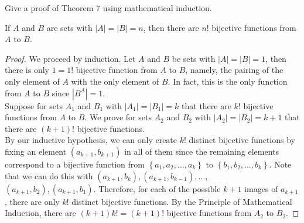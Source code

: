 \documentclass[12pt]{article}
\newcommand{\Abs}[1]{\left\vert #1 \right\vert}
\newenvironment{problem}[2][Problem]{\begin{trivlist} \item[\hskip \labelsep {\bfseries #1}\hskip \labelsep {\bfseries #2.}]}{\end{trivlist}}
\newenvironment{solution}[1][Solution]{\begin{trivlist} \item[\hskip \labelsep {\bfseries #1}]}{\end{trivlist}}
\begin{document}
    \begin{problem}{34}
      Give a proof of Theorem 7 using mathematical induction.
    \begin{solution}
      If $A$ and $B$ are sets with $|A|=|B|=n$, then there are $n!$ bijective functions from $A$ to $B$. 
    \begin{proof}
      We proceed by induction. Let $A$ and $B$ be sets with $|A|=|B|=1$, then there is only $1=1!$ bijective function from $A$ to $B$, namely, the pairing of the only element of $A$ with the only element of $B$. In fact, this is the only function from $A$ to $B$ since $\Abs{B^{A}} = 1$. \\
      Suppose for sets $A_{1}$ and $B_{1}$ with $|A_{1}| = |B_{1}|=k$ that there are $k!$ bijective functions from $A$ to $B$. We prove for sets $A_{2}$ and $B_{2}$ with $|A_{2}|=|B_{2}|=k+1$ that there are $(k+1)!$ bijective functions.\\
      By our inductive hypothesis, we can only create $k!$ distinct bijective functions by fixing an element $(a_{k+1}, b_{k+1})$ in all of them since the remaining elements correspond to a bijective function from $\left\{ a_{1},a_{2},\dots,a_{k} \right\}$ to $\left\{ b_{1},b_{2},\dots,b_{k} \right\}$.  Note that we can do this with $(a_{k+1},b_{k}),(a_{k+1},b_{k-1}),\dots,$ $(a_{k+1},b_{2}),(a_{k+1},b_{1})$. Therefore, for each of the possible $k+1$ images of $a_{k+1}$, there are only $k!$ distinct bijective functions. By the Principle of Mathematical Induction,  there are $(k+1)k! = (k+1)!$ bijective functions from $A_{2}$ to $B_{2}$. 
    \end{proof}
    \end{solution}
    \end{problem}
\end{document}
